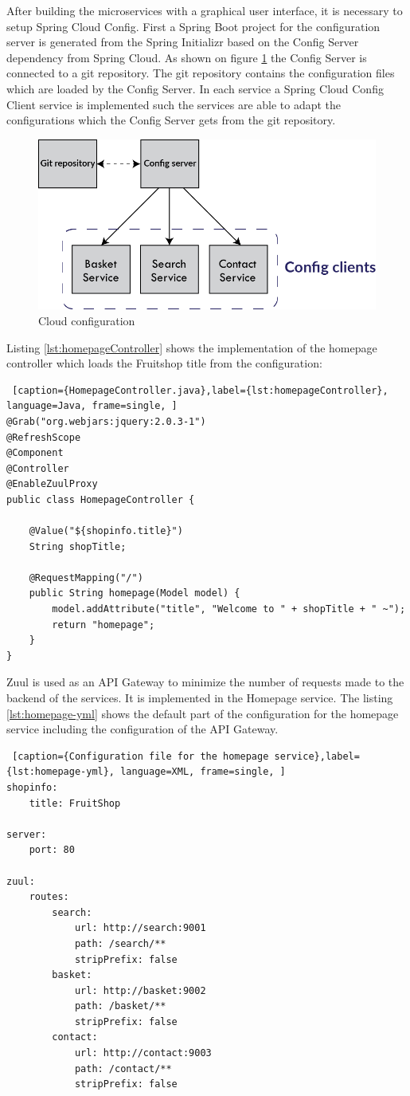 After building the microservices with a graphical user interface, it is necessary to setup Spring Cloud Config.
First a Spring Boot project for the configuration server is generated from the Spring Initializr based on the Config Server dependency from Spring Cloud. As shown on figure \ref{fig:cloud-config} the Config Server is connected to a git repository. The git repository contains the configuration files which are loaded by the Config Server. In each service a Spring Cloud Config Client service is implemented such the services are able to adapt the configurations which the Config Server gets from the git repository.  
\begin{figure}[bth]
	\includegraphics[width=1\linewidth]{gfx/cloud-config}
	\caption[cloudconfig]{Cloud configuration} \label{fig:cloud-config}
\end{figure}

Listing \ref{lst:homepageController} shows the implementation of the homepage  controller which loads the Fruitshop title from the configuration:  
\begin{lstlisting} [caption={HomepageController.java},label={lst:homepageController}, language=Java, frame=single, ]
@Grab("org.webjars:jquery:2.0.3-1")
@RefreshScope
@Component
@Controller
@EnableZuulProxy
public class HomepageController {

	@Value("${shopinfo.title}")
	String shopTitle;

	@RequestMapping("/")
	public String homepage(Model model) {
		model.addAttribute("title", "Welcome to " + shopTitle + " ~");
		return "homepage";
	}
}
\end{lstlisting}

Zuul is used as an API Gateway to minimize the number of requests made to the backend of the services. It is implemented in the Homepage service.
The listing \ref{lst:homepage-yml} shows the default part of the configuration for the homepage service including the configuration of the API Gateway.  
\begin{lstlisting} [caption={Configuration file for the homepage service},label={lst:homepage-yml}, language=XML, frame=single, ]
shopinfo:
	title: FruitShop
	
server:
	port: 80
	
zuul:  
	routes:
		search:
			url: http://search:9001
			path: /search/**
			stripPrefix: false
		basket:
			url: http://basket:9002
			path: /basket/**
			stripPrefix: false
		contact:
			url: http://contact:9003
			path: /contact/**
			stripPrefix: false
\end{lstlisting}
